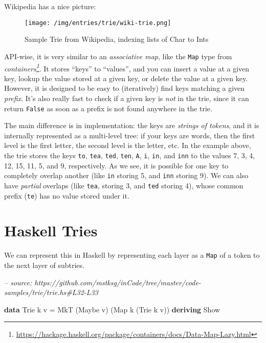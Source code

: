\documentclass[]{article}
\newenvironment{Shaded}{}{}
\newcommand{\CommentTok}[1]{\textcolor[rgb]{0.38,0.63,0.69}{\textit{#1}}}
\newcommand{\DataTypeTok}[1]{\textcolor[rgb]{0.56,0.13,0.00}{#1}}
\newcommand{\FunctionTok}[1]{\textcolor[rgb]{0.02,0.16,0.49}{#1}}
\newcommand{\KeywordTok}[1]{\textcolor[rgb]{0.00,0.44,0.13}{\textbf{#1}}}
\newcommand{\NormalTok}[1]{#1}
\renewcommand{\href}[2]{#2\footnote{\url{#1}}}
\begin{document}
Wikipedia has a nice picture:

\begin{figure}
\centering
\texttt{[image: /img/entries/trie/wiki-trie.png]}
\caption{Sample Trie from Wikipedia, indexing lists of Char to Ints}
\end{figure}

API-wise, it is very similar to an \emph{associative map}, like the \texttt{Map}
type from
\emph{\href{https://hackage.haskell.org/package/containers/docs/Data-Map-Lazy.html}{containers}}.
It stores ``keys'' to ``values'', and you can insert a value at a given key,
lookup the value stored at a given key, or delete the value at a given key.
However, it is designed to be easy to (iteratively) find keys matching a given
\emph{prefix}. It's also really fast to check if a given key is \emph{not} in
the trie, since it can return \texttt{False} as soon as a prefix is not found
anywhere in the trie.

The main difference is in implementation: the keys are \emph{strings of tokens},
and it is internally represented as a multi-level tree: if your keys are words,
then the first level is the first letter, the second level is the letter, etc.
In the example above, the trie stores the keys \texttt{to}, \texttt{tea},
\texttt{ted}, \texttt{ten}, \texttt{A}, \texttt{i}, \texttt{in}, and
\texttt{inn} to the values 7, 3, 4, 12, 15, 11, 5, and 9, respectively. As we
see, it is possible for one key to completely overlap another (like \texttt{in}
storing 5, and \texttt{inn} storing 9). We can also have \emph{partial} overlaps
(like \texttt{tea}, storing 3, and \texttt{ted} storing 4), whose common prefix
(\texttt{te}) has no value stored under it.

\hypertarget{haskell-tries}{%
\section{Haskell Tries}\label{haskell-tries}}

We can represent this in Haskell by representing each layer as a \texttt{Map} of
a token to the next layer of subtries.

\begin{Shaded}
\begin{Highlighting}[]
\CommentTok{-- source: https://github.com/mstksg/inCode/tree/master/code-samples/trie/trie.hs#L32-L33}

\KeywordTok{data} \DataTypeTok{Trie}\NormalTok{  k v   }\FunctionTok{=} \DataTypeTok{MkT}\NormalTok{  (}\DataTypeTok{Maybe}\NormalTok{ v) (}\DataTypeTok{Map}\NormalTok{ k (}\DataTypeTok{Trie}\NormalTok{ k v))}
  \KeywordTok{deriving} \DataTypeTok{Show}
\end{Highlighting}
\end{Shaded}
\end{document}
